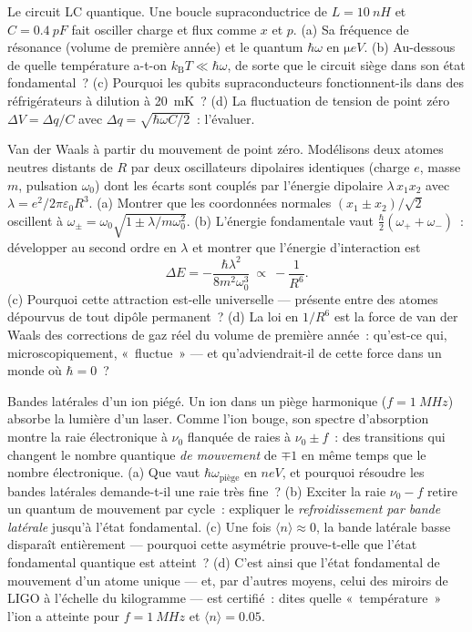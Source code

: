 \begin{exercise}[$\star\star$]\label{exo:b3:harmonic-oscillator:9}
Le circuit LC quantique. Une boucle supraconductrice de $L =
\qty{10}{nH}$ et $C = \qty{0.4}{pF}$ fait osciller charge et flux
comme $x$ et $p$. (a) Sa fréquence de résonance (volume de première
année) et le quantum $\hbar\omega$ en $\unit{\micro eV}$. (b)
Au-dessous de quelle température a-t-on $k_{\text{B}}T \ll \hbar\omega$,
de sorte que le circuit siège dans son état fondamental~? (c) Pourquoi
les qubits supraconducteurs fonctionnent-ils dans des réfrigérateurs à
dilution à \qty{20}{mK}~? (d) La fluctuation de tension de point zéro
$\Delta V = \Delta q/C$ avec $\Delta q =
\sqrt{\hbar\omega C/2}$~: l'évaluer.
\end{exercise}

\begin{exercise}[$\star\star\star$]\label{exo:b3:harmonic-oscillator:10}
Van der Waals à partir du mouvement de point zéro. Modélisons deux
atomes neutres distants de $R$ par deux oscillateurs dipolaires
identiques (charge $e$, masse $m$, pulsation $\omega_0$) dont les
écarts sont couplés par l'énergie dipolaire $\lambda\,x_1x_2$ avec
$\lambda = e^2/2\pi\varepsilon_0R^3$. (a) Montrer que les coordonnées
normales $(x_1 \pm x_2)/\sqrt2$ oscillent à
$\omega_\pm = \omega_0\sqrt{1 \pm \lambda/m\omega_0^2}$. (b) L'énergie
fondamentale vaut $\tfrac\hbar2(\omega_+ + \omega_-)$~: développer au
second ordre en $\lambda$ et montrer que l'énergie d'interaction est
\[
\Delta E = -\frac{\hbar\lambda^2}{8m^2\omega_0^3}
\ \propto\ -\frac{1}{R^6} .
\]
(c) Pourquoi cette attraction est-elle universelle --- présente entre
des atomes dépourvus de tout dipôle permanent~? (d) La loi en $1/R^6$
est la force de van der Waals des corrections de gaz réel du volume de
première année~: qu'est-ce qui, microscopiquement, «~fluctue~» --- et
qu'adviendrait-il de cette force dans un monde où $\hbar = 0$~?
\end{exercise}

\begin{exercise}[$\star\star\star$]\label{exo:b3:harmonic-oscillator:11}
Bandes latérales d'un ion piégé. Un ion dans un piège harmonique ($f =
\qty{1}{MHz}$) absorbe la lumière d'un laser. Comme l'ion bouge, son
spectre d'absorption montre la raie électronique à $\nu_0$ flanquée de
raies à $\nu_0 \pm f$~: des transitions qui changent le nombre
quantique \emph{de mouvement} de $\mp1$ en même temps que le nombre
électronique. (a) Que vaut $\hbar\omega_{\text{piège}}$ en
$\unit{neV}$, et pourquoi résoudre les bandes latérales demande-t-il
une raie très fine~? (b) Exciter la raie $\nu_0 - f$ retire un quantum
de mouvement par cycle~: expliquer le \emph{refroidissement par bande
latérale} jusqu'à l'état fondamental. (c) Une fois $\langle n\rangle \approx
0$, la bande latérale basse disparaît entièrement --- pourquoi cette
asymétrie prouve-t-elle que l'état fondamental quantique est atteint~?
(d) C'est ainsi que l'état fondamental de mouvement d'un atome unique
--- et, par d'autres moyens, celui des miroirs de LIGO à l'échelle du
kilogramme --- est certifié~: dites quelle «~température~» l'ion a
atteinte pour $f = \qty{1}{MHz}$ et $\langle n\rangle = 0.05$.
\end{exercise}

